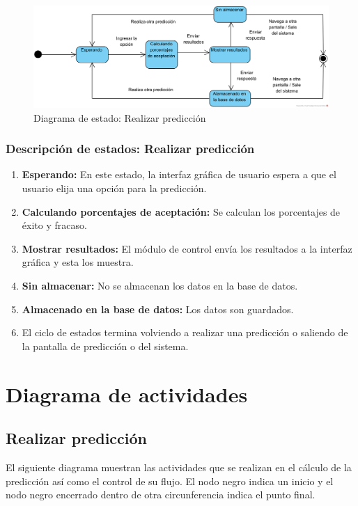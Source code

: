 \begin{figure}[!ht]
    \centering
    \includegraphics[scale=0.850]{TT/img/diseño/Realizar predicción DS.png}
    \caption{Diagrama de estado: Realizar predicción}
    \label{graphic:DE-Realizar predicción}
\end{figure}

\subsubsection{Descripción de estados: Realizar predicción}
\begin{enumerate}
    \item \textbf{Esperando: }En este estado, la interfaz gráfica de usuario espera a que el usuario elija una opción para la predicción.
    \item \textbf{Calculando porcentajes de aceptación: }Se calculan los porcentajes de éxito y fracaso.
    \item \textbf{Mostrar resultados: }El módulo de control envía los resultados a la interfaz gráfica y esta los muestra.
    \item \textbf{Sin almacenar: }No se almacenan los datos en la base de datos.
    \item \textbf{Almacenado en la base de datos: }Los datos son guardados.
    \item El ciclo de estados termina volviendo a realizar una predicción o saliendo de la pantalla de predicción o del sistema.
\end{enumerate}

\section{Diagrama de actividades}

\subsection{Realizar predicción}
El siguiente diagrama muestran las actividades que se realizan en el cálculo de la predicción así como el control de su flujo. El nodo negro indica un inicio y el nodo negro encerrado dentro de otra circunferencia indica el punto final.


